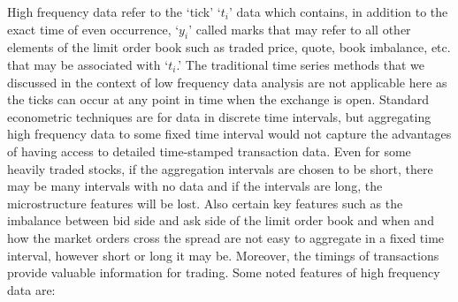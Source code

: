 High frequency data refer to the `tick' `$t_i$' data which contains, in addition to the exact time of even occurrence, `$y_i$' called marks that may refer to all other elements of the limit order book such as traded price, quote, book imbalance, etc. that may be associated with `$t_i$.' The traditional time series methods that we discussed in the context of low frequency data analysis are not applicable here as the ticks can occur at any point in time when the exchange is open. Standard econometric techniques are for data in discrete time intervals, but aggregating high frequency data to some fixed time interval would not capture the advantages of having access to detailed time-stamped transaction data. Even for some heavily traded stocks, if the aggregation intervals are chosen to be short, there may be many intervals with no data and if the intervals are long, the microstructure features will be lost. Also certain key features such as the imbalance between bid side and ask side of the limit order book and when and how the market orders cross the spread are not easy to aggregate in a fixed time interval, however short or long it may be. Moreover, the timings of transactions provide valuable information for trading. Some noted features of high frequency data are:


